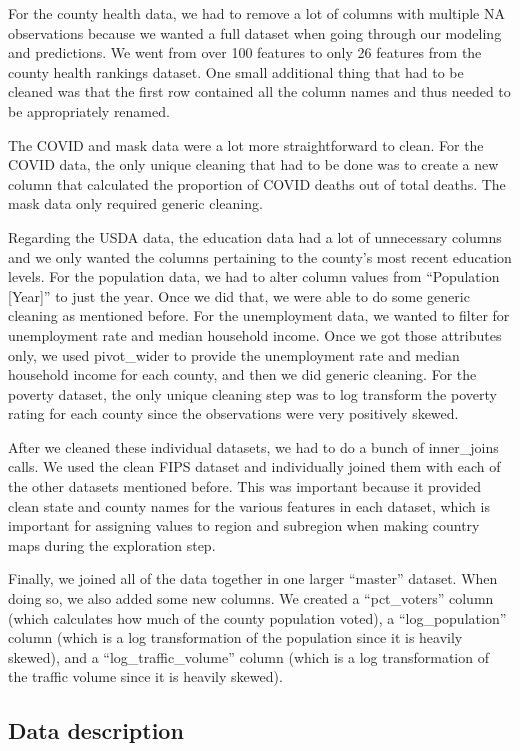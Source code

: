 \documentclass[
]{article}
\begin{document}
For the county health data, we had to remove a lot of columns with multiple NA observations because we wanted a full dataset when going through our modeling and predictions. We went from over 100 features to only 26 features from the county health rankings dataset. One small additional thing that had to be cleaned was that the first row contained all the column names and thus needed to be appropriately renamed.

The COVID and mask data were a lot more straightforward to clean. For the COVID data, the only unique cleaning that had to be done was to create a new column that calculated the proportion of COVID deaths out of total deaths. The mask data only required generic cleaning.

Regarding the USDA data, the education data had a lot of unnecessary columns and we only wanted the columns pertaining to the county's most recent education levels. For the population data, we had to alter column values from ``Population {[}Year{]}'' to just the year. Once we did that, we were able to do some generic cleaning as mentioned before. For the unemployment data, we wanted to filter for unemployment rate and median household income. Once we got those attributes only, we used pivot\_wider to provide the unemployment rate and median household income for each county, and then we did generic cleaning. For the poverty dataset, the only unique cleaning step was to log transform the poverty rating for each county since the observations were very positively skewed.

After we cleaned these individual datasets, we had to do a bunch of inner\_joins calls. We used the clean FIPS dataset and individually joined them with each of the other datasets mentioned before. This was important because it provided clean state and county names for the various features in each dataset, which is important for assigning values to region and subregion when making country maps during the exploration step.

Finally, we joined all of the data together in one larger ``master'' dataset. When doing so, we also added some new columns. We created a ``pct\_voters'' column (which calculates how much of the county population voted), a ``log\_population'' column (which is a log transformation of the population since it is heavily skewed), and a ``log\_traffic\_volume'' column (which is a log transformation of the traffic volume since it is heavily skewed).

\hypertarget{data-description}{%
\subsection{Data description}\label{data-description}}
\end{document}
